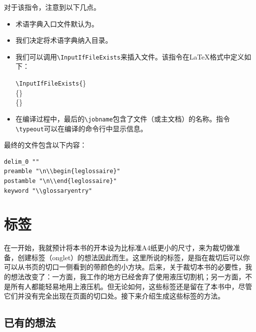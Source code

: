 对于该指令，注意到以下几点。

\begin{itemize}
    \item 术语字典入口文件默认为。
    \item 我们决定将术语字典纳入目录。
    \item 我们可以调用\verb|\InputIfFileExists|来插入文件。该指令在\LaTeX 格式中定义如下：
    
    \begin{dmd}
    \verb|\InputIfFileExists{|\}\\
    \{\}\\
    \{\}
    \end{dmd}

    \item 在编译过程中，最后的\verb|\jobname|包含了文件（或主文档）的名称。指令\verb|\typeout|可以在编译的命令行中显示信息。
\end{itemize}

最终的文件包含以下内容：

\begin{dmd}
\begin{verbatim}
delim_0 ""
preamble "\n\\begin{leglossaire}"
postamble "\n\\end{leglossaire}"
keyword "\\glossaryentry"\end{verbatim}
\end{dmd}

\section{标签}

\fancyhead[LE]{\bfseries\thepage}
\fancyhead[RO]{\bfseries\thepage}

在一开始，我就预计将本书的开本设为比标准A4纸更小的尺寸，来为裁切做准备，创建标签（onglet）的想法因此而生。这里所说的标签，是指在裁切后可以你可以从书页的切口一侧看到的带颜色的小方块。后来，关于裁切本书的必要性，我的想法改变了：一方面，我工作的地方已经舍弃了使用液压切割机；另一方面，不是所有人都能轻易地用上液压机。但无论如何，这些标签还是留在了本书中，尽管它们并没有完全出现在页面的切口处。接下来介绍生成这些标签的方法。

\subsection{已有的想法}

